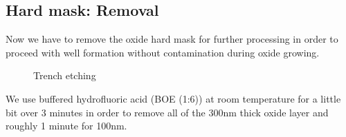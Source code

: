 \subsection{Hard mask: Removal}

Now we have to remove the oxide hard mask for further processing in order to proceed with well formation without contamination during oxide growing.

\begin{figure}[H]
	\centering
	\begin{tikzpicture}[node distance = 3cm, auto, thick,scale=\CrossSectionOnly, every node/.style={transform shape}]
		
	\end{tikzpicture}
	\drawStepArrow{}
	\begin{tikzpicture}[node distance = 3cm, auto, thick,scale=\CrossSectionOnly, every node/.style={transform shape}]
		
	\end{tikzpicture}
	\caption{Trench etching}
\end{figure}

We use buffered hydrofluoric acid (BOE (1:6)) at room temperature for a little bit over 3 minutes in order to remove all of the 300nm thick oxide layer and roughly 1 minute for 100nm.

